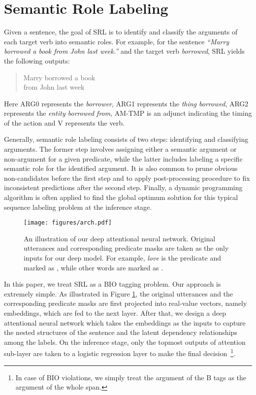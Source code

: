 \documentclass[letterpaper]{article} \usepackage{aaai18}  \usepackage{times}  \usepackage{helvet}  \usepackage{courier}  \usepackage{url}  \usepackage{graphicx}  \frenchspacing  \setlength{\pdfpagewidth}{8.5in}  \setlength{\pdfpageheight}{11in}  \usepackage{latexsym}
\begin{document}
\section{Semantic Role Labeling}
Given a sentence, the goal of SRL is to identify and classify the arguments of each target verb into semantic roles. For example, for the sentence \textit{``Marry borrowed a book from John last week.''} and the target verb \textit{borrowed}, SRL yields the following outputs:

\begin{verse}
  Marry 
  borrowed 
 a book  \\
 from John 
  last week 
\end{verse}

Here ARG0 represents the \textit{borrower}, ARG1 represents the \textit{thing borrowed}, ARG2 represents the \textit{entity borrowed from}, AM-TMP is an adjunct indicating the timing of the action and V represents the verb.

Generally, semantic role labeling consists of two steps: identifying and classifying arguments. The former step involves assigning either a semantic argument or non-argument for a given predicate, while the latter includes labeling a specific semantic role for the identified argument. It is also common to prune obvious non-candidates before the first step and to apply post-processing procedure to fix inconsistent predictions after the second step. Finally, a dynamic programming algorithm is often applied to find the global optimum solution for this typical sequence labeling problem at the inference stage.

\begin{figure}[!ht]
\begin{center}
  \texttt{[image: figures/arch.pdf]}
\end{center}
\caption{An illustration of our deep attentional neural network. Original utterances and corresponding predicate masks are taken as the only inputs for our deep model. For example, \textit{love} is the predicate and marked as , while other words are marked as .}
\label{f:overall}
\end{figure}

In this paper, we treat SRL as a BIO tagging problem. Our approach is extremely simple. As illustrated in Figure \ref{f:overall}, the original utterances and the corresponding predicate masks are first projected into real-value vectors, namely embeddings, which are fed to the next layer. After that, we design a deep attentional neural network which takes the embeddings as the inputs to capture the nested structures of the sentence and the latent dependency relationships among the labels. On the inference stage, only the topmost outputs of attention sub-layer are taken to a logistic regression layer to make the final decision~\footnote{In case of BIO violations, we simply treat the argument of the B tags as the argument of the whole span.}.
\end{document}
